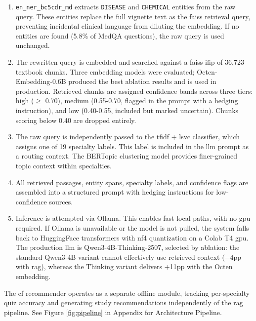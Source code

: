 \begin{enumerate}
    \item \texttt{en\_ner\_bc5cdr\_md} extracts \texttt{DISEASE} and \texttt{CHEMICAL} entities from the raw query. These entities replace the full vignette text as the \gls{faiss} retrieval query, preventing incidental clinical language from diluting the embedding. If no entities are found (5.8\% of MedQA questions), the raw query is used unchanged. 

    \item The rewritten query is embedded and searched against a \gls{faiss} \gls{ifip} of 36,723 textbook chunks. Three embedding models were evaluated; Octen-Embedding-0.6B produced the best ablation results and is used in production. Retrieved chunks are assigned confidence bands across three tiers: high ($\geq$ 0.70), medium (0.55-0.70, flagged in the prompt with a hedging instruction), and low (0.40-0.55, included but marked uncertain). Chunks scoring below 0.40 are dropped entirely. 

    \item The raw query is independently passed to the \gls{tfidf} + \gls{lsvc} classifier, which assigns one of 19 specialty labels. This label is included in the \gls{llm} prompt as a routing context. The BERTopic clustering model provides finer-grained topic context within specialties. 

    \item All retrieved passages, entity spans, specialty labels, and confidence flags are assembled into a structured prompt with hedging instructions for low-confidence sources. 

    \item Inference is attempted via Ollama. This enables fast local paths, with no \gls{gpu} required. If Ollama is unavailable or the model is not pulled, the system falls back to HuggingFace transformers with \gls{nf4} quantization on a Colab T4 \gls{gpu}. The production \gls{llm} is Qwen3-4B-Thinking-2507, selected by ablation: the standard Qwen3-4B variant cannot effectively use retrieved context ($-4$\gls{pp} with \gls{rag}), whereas the Thinking variant delivers +11\gls{pp} with the Octen embedding. 
\end{enumerate}

The \gls{cf} recommender operates as a separate offline module, tracking per-specialty quiz accuracy and generating study recommendations independently of the \gls{rag} pipeline. See Figure \ref{fig:pipeline} in Appendix for Architecture Pipeline.

